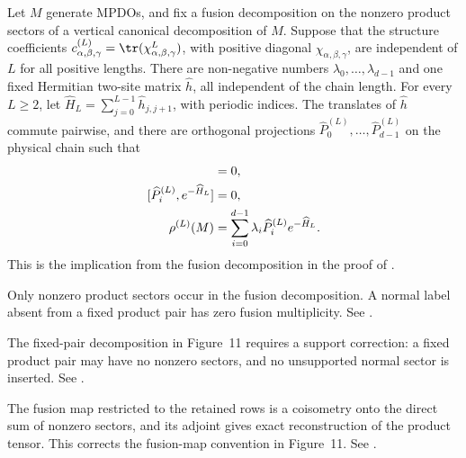 \begin{lemma}%
    \label{thm:mpdo_fusion_clause_physical_coordinate_gibbs_at_least_two}
    \leanok
    Let $M$ generate MPDOs, and fix a fusion decomposition on the nonzero
    product sectors of a vertical canonical decomposition of $M$.
    Suppose that the structure coefficients
    $c_{\alpha,\beta,\gamma}^{(L)}
        =\tr(\chi_{\alpha,\beta,\gamma}^{L})$, with positive diagonal
    $\chi_{\alpha,\beta,\gamma}$, are independent of $L$ for all positive
    lengths. There are non-negative numbers $\lambda_0,\ldots,\lambda_{d-1}$
    and one fixed Hermitian two-site matrix $\widehat h$, all independent
    of the chain length. For every $L\geq2$, let
    $\widehat H_L=\sum_{j=0}^{L-1}\widehat h_{j,j+1}$, with periodic indices.
    The translates of $\widehat h$ commute pairwise, and there are orthogonal
    projections $\widehat P_0^{(L)},\ldots,\widehat P_{d-1}^{(L)}$ on the
    physical chain such that
    \begin{align}
        [\widehat h_{j-1,j},\widehat h_{j,j+1}]
         & =0,
        \notag                                          \\
        [\widehat P_i^{(L)},e^{-\widehat H_L}]
         & =0,
        \notag                                          \\
        \rho^{(L)}(M)
         & =\sum_{i=0}^{d-1}\lambda_i\widehat P_i^{(L)}
        e^{-\widehat H_L}.
        \label{eq:rfp_physical_gibbs_sum}
    \end{align}
    This is the implication from the fusion decomposition in the proof of
    \cite[lines~999--1016]{Cirac2016MPDO_arXiv}.

    Only nonzero product sectors occur in the fusion decomposition. A normal
    label absent from a fixed product pair has zero fusion multiplicity. See
    \cite{gap:cpsv16_bnt_uniqueness_zero_coefficient}.

    The fixed-pair decomposition in Figure~11 requires a support correction:
    a fixed product pair may have no nonzero sectors, and no unsupported
    normal sector is inserted. See
    \cite{gap:cpsv16_figure11_per_pair_support}.

    The fusion map restricted to the retained rows is a coisometry onto the
    direct sum of nonzero sectors, and its adjoint gives exact reconstruction
    of the product tensor. This corrects the fusion-map convention in
    Figure~11. See
    \cite{gap:cpsv16_figure11_fusion_coisometry}.


\end{lemma}
